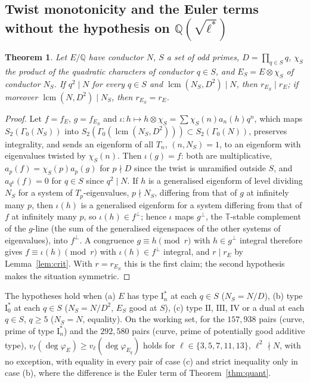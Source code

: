 \documentclass[11pt]{amsart}
\newtheorem{theorem}{Theorem}[section]
\theoremstyle{definition}
\newcommand{\Q}{\mathbb{Q}}
\newcommand{\T}{\mathbb{T}}
\newcommand{\degphi}{\deg\varphi_E}
\begin{document}
\subsection{Twist monotonicity and the Euler terms without the hypothesis on \texorpdfstring{$\Q(\sqrt{\ell^*})$}{Q(sqrt l*)}}\label{sec:twisting}
\begin{theorem}\label{thm:twist}
Let $E/\Q$ have conductor $N$, $S$ a set of odd primes, $D=\prod_{q\in S}q$, $\chi_S$ the product of the quadratic characters of conductor $q\in S$, and $E_S=E\otimes\chi_S$ of conductor $N_S$. If $q^2\mid N$ for every $q\in S$ and $\operatorname{lcm}(N_S,D^2)\mid N$, then $r_{E_S}\mid r_E$; if moreover $\operatorname{lcm}(N,D^2)\mid N_S$, then $r_{E_S}=r_E$.
\end{theorem}
\begin{proof}
Let $f=f_E$, $g=f_{E_S}$ and $\iota\colon h\mapsto h\otimes\chi_S=\sum\chi_S(n)a_n(h)q^n$, which maps $S_2(\Gamma_0(N_S))$ into $S_2(\Gamma_0(\operatorname{lcm}(N_S,D^2)))\subset S_2(\Gamma_0(N))$, preserves integrality, and sends an eigenform of all $T_n$, $(n,N_S)=1$, to an eigenform with eigenvalues twisted by $\chi_S(n)$. Then $\iota(g)=f$: both are multiplicative, $a_p(f)=\chi_S(p)a_p(g)$ for $p\nmid D$ since the twist is unramified outside $S$, and $a_{q^k}(f)=0$ for $q\in S$ since $q^2\mid N$. If $h$ is a generalised eigenform of level dividing $N_S$ for a system of $T_p$-eigenvalues, $p\nmid N_S$, differing from that of $g$ at infinitely many $p$, then $\iota(h)$ is a generalised eigenform for a system differing from that of $f$ at infinitely many $p$, so $\iota(h)\in f^\perp$; hence $\iota$ maps $g^\perp$, the $\T$-stable complement of the $g$-line (the sum of the generalised eigenspaces of the other systems of eigenvalues), into $f^\perp$. A congruence $g\equiv h\pmod r$ with $h\in g^\perp$ integral therefore gives $f\equiv\iota(h)\pmod r$ with $\iota(h)\in f^\perp$ integral, and $r\mid r_E$ by Lemma~\ref{lem:crit}. With $r=r_{E_S}$ this is the first claim; the second hypothesis makes the situation symmetric.
\end{proof}
The hypotheses hold when (a) $E$ has type $\mathrm{I}_n^*$ at each $q\in S$ ($N_S=N/D$), (b) type $\mathrm{I}_0^*$ at each $q\in S$ ($N_S=N/D^2$, $E_S$ good at $S$), (c) type $\mathrm{II}$, $\mathrm{III}$, $\mathrm{IV}$ or a dual at each $q\in S$, $q\ge5$ ($N_S=N$, equality). On the working set, for the $157{,}938$ pairs (curve, prime of type $\mathrm{I}_n^*$) and the $292{,}580$ pairs (curve, prime of potentially good additive type), $v_\ell(\degphi)\ge v_\ell(\deg\varphi_{E_q})$ holds for $\ell\in\{3,5,7,11,13\}$, $\ell^2\nmid N$, with no exception, with equality in every pair of case (c) and strict inequality only in case (b), where the difference is the Euler term of Theorem~\ref{thm:quant}.
\end{document}
